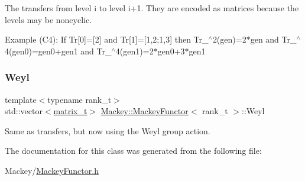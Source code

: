 The transfers from level i to level i+1. They are encoded as matrices because the levels may be noncyclic. 

Example (C4)\+: If Tr\mbox{[}0\mbox{]}=\mbox{[}2\mbox{]} and Tr\mbox{[}1\mbox{]}=\mbox{[}1,2;1,3\mbox{]} then Tr\+\_$^\wedge$2(gen)=2$\ast$gen and Tr\+\_$^\wedge$4(gen0)=gen0+gen1 and Tr\+\_$^\wedge$4(gen1)=2$\ast$gen0+3$\ast$gen1 \mbox{\label{classMackey_1_1MackeyFunctor_a0b2f1a52b0a49f7544ba1025bbe95319}} 
\subsubsection{\texorpdfstring{Weyl}{Weyl}}
{\footnotesize\ttfamily template$<$typename rank\+\_\+t$>$ \\
std\+::vector$<$\hyperlink{classMackey_1_1MackeyFunctor_a271550bc911da5c842bbc90d8bf87973}{matrix\+\_\+t}$>$ \hyperlink{classMackey_1_1MackeyFunctor}{Mackey\+::\+Mackey\+Functor}$<$ rank\+\_\+t $>$\+::Weyl}



Same as transfers, but now using the Weyl group action. 



The documentation for this class was generated from the following file\+:\begin{DoxyCompactItemize}
\item 
Mackey/\hyperlink{MackeyFunctor_8h}{Mackey\+Functor.\+h}\end{DoxyCompactItemize}
